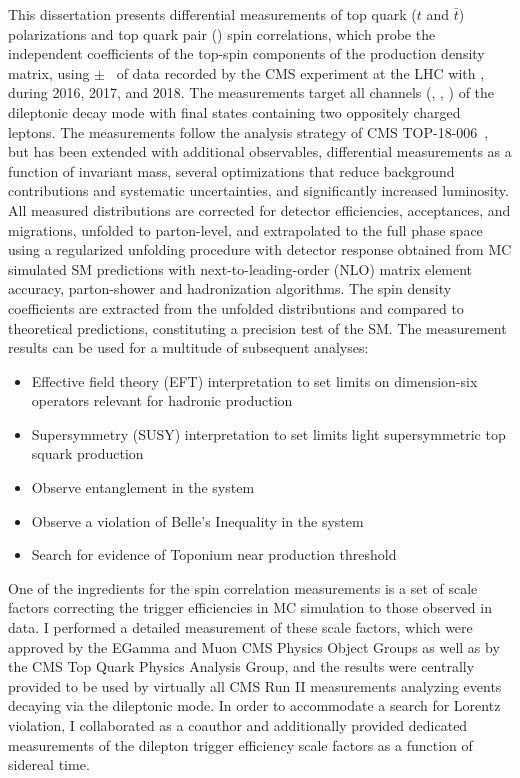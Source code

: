 This dissertation presents differential measurements of top quark ($t$ and $\bar{t}$) polarizations and top quark pair (\ttbar) spin correlations, which probe the independent coefficients of the top-spin components of the \ttbar production density matrix, using \lumivalueRuniiUL $\pm$ \lumierrRuniiUL\ of data recorded by the CMS experiment at the LHC with \beamenergy, during 2016, 2017, and 2018.
The measurements target all channels (\ee, \emu, \mumu) of the \ttbar dileptonic decay mode with final states containing two oppositely charged leptons.
The measurements follow the analysis strategy of CMS TOP-18-006~\cite{Sirunyan:2681777}, but has been extended with additional observables, differential measurements as a function of \ttbar invariant mass, several optimizations that reduce background contributions and systematic uncertainties, and significantly increased luminosity.
All measured distributions are corrected for detector efficiencies, acceptances, and migrations, unfolded to parton-level, and extrapolated to the full phase space using a regularized unfolding procedure with detector response obtained from MC simulated SM predictions with next-to-leading-order (NLO) matrix element accuracy, parton-shower and hadronization algorithms.
The spin density coefficients are extracted from the unfolded distributions and compared to theoretical predictions, constituting a precision test of the SM.
The measurement results can be used for a multitude of subsequent analyses:
\begin{itemize}
    \item Effective field theory (EFT) interpretation to set limits on dimension-six operators relevant for hadronic \ttbar production~\cite{Sirunyan:2681777}
    \item Supersymmetry (SUSY) interpretation to set limits light supersymmetric top squark production~\cite{CMS-PAS-FTR-18-034}
    \item Observe entanglement in the \ttbar system~\cite{Afik_2021}
    \item Observe a violation of Belle's Inequality in the \ttbar system~\cite{Aguilar_Saavedra_2022}
    \item Search for evidence of Toponium near \ttbar production threshold~\cite{PhysRevD.104.034023}
\end{itemize}

One of the ingredients for the \ttbar spin correlation measurements is a set of scale factors correcting the trigger efficiencies in MC simulation to those observed in data.
I performed a detailed measurement of these scale factors, which were approved by the EGamma and Muon CMS Physics Object Groups as well as by the CMS Top Quark Physics Analysis Group, and the results were centrally provided to be used by virtually all CMS Run II measurements analyzing \ttbar events decaying via the dileptonic mode.
In order to accommodate a search for Lorentz violation, I collaborated as a coauthor and additionally provided dedicated measurements of the dilepton trigger efficiency scale factors as a function of sidereal time.

